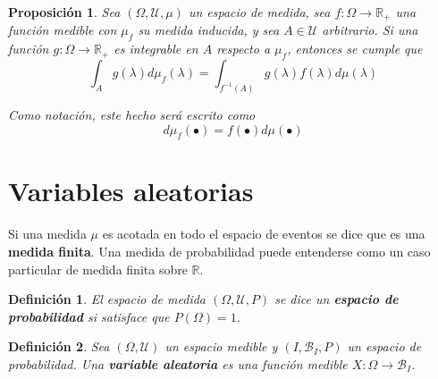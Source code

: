 \documentclass[12pt,letterpaper]{book}
\newtheorem{definicion}{Definición}[chapter]
\newtheorem{proposicion}[teorema]{Proposición}
\newcommand{\R}{\mathbb{R}}
\begin{document}
\begin{proposicion}
Sea $(\Omega, \mathcal{U}, \mu)$ un espacio de medida, sea $f:\Omega \rightarrow \R_+$ una función medible con $\mu_f$ su medida inducida, y sea $A\in \mathcal{U}$ arbitrario.
%
Si una función $g:\Omega \rightarrow \R_+$ es integrable en $A$ respecto a $\mu_f$, entonces se cumple que 
\begin{equation}
\int_A g(\lambda) d\mu_f(\lambda) = \int_{f^{-1}(A)} g(\lambda) f(\lambda) d\mu(\lambda)
\end{equation}

Como notación, este hecho será escrito como
\begin{equation}
d\mu_f(\bullet) = f(\bullet) d\mu(\bullet) 
\end{equation}
\label{lazy3}
\end{proposicion}



\section{Variables aleatorias}

Si una medida $\mu$ es acotada en todo el espacio de eventos se dice que es una \textbf{medida finita}.%
%
Una medida de probabilidad puede entenderse como un caso particular de medida finita sobre $\R$.

\begin{definicion}
El espacio de medida $(\Omega,\mathcal{U},P)$ se dice un \textbf{espacio de probabilidad} si satisface que $P(\Omega) = 1$.
\end{definicion}


\begin{definicion}
Sea $(\Omega,\mathcal{U})$ un espacio medible y $(I,\mathcal{B}_I,P)$ un espacio de probabilidad. Una \textbf{variable aleatoria} es una función medible $X: \Omega \rightarrow \mathcal{B}_I$.
\label{lazy4}
\end{definicion}
\end{document}
